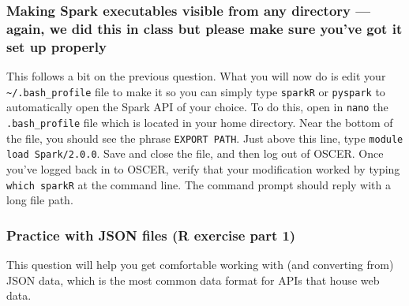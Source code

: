 \documentclass[12pt,english]{exam}
\begin{document}
\begin{questions}
\subsubsection*{Making Spark executables visible from any directory --- again, we did this in class but please make sure you've got it set up properly}
\question This follows a bit on the previous question. What you will now do is edit your \texttt{\textasciitilde/.bash\_profile} file to make it so you can simply type \texttt{sparkR} or \texttt{pyspark} to automatically open the Spark API of your choice.
To do this, open in \texttt{nano} the \texttt{.bash\_profile} file which is located in your home directory.
Near the bottom of the file, you should see the phrase \texttt{EXPORT PATH}. Just above this line, type \texttt{module load Spark/2.0.0}. Save and close the file, and then log out of OSCER.
Once you've logged back in to OSCER, verify that your modification worked by typing \texttt{which sparkR} at the command line. The command prompt should reply with a long file path.
\subsubsection*{Practice with JSON files (R exercise part 1)}
\question This question will help you get comfortable working with (and converting from) JSON data, which is the most common data format for APIs that house web data.
\end{questions}
\end{document}
